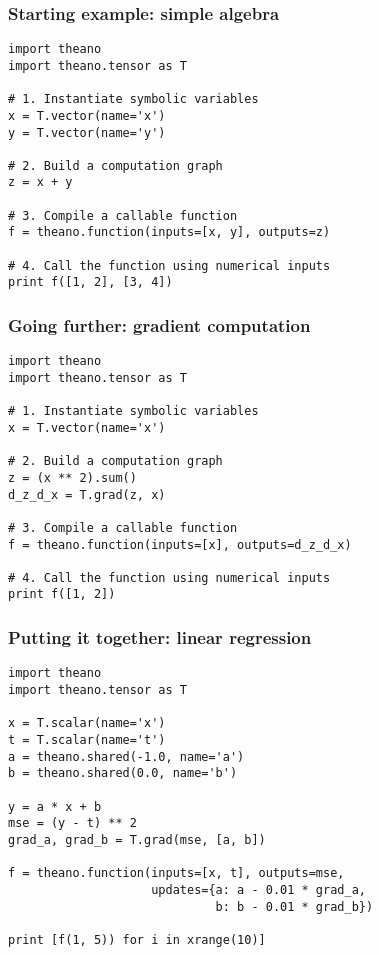 \documentclass[mathserif, xcolor=dvipsnames]{beamer}
\begin{document}
\begin{frame}[fragile]
    \frametitle{Starting example: simple algebra}
\begin{lstlisting}
import theano
import theano.tensor as T

# 1. Instantiate symbolic variables
x = T.vector(name='x')
y = T.vector(name='y')

# 2. Build a computation graph
z = x + y

# 3. Compile a callable function
f = theano.function(inputs=[x, y], outputs=z)

# 4. Call the function using numerical inputs
print f([1, 2], [3, 4])
\end{lstlisting}
\end{frame}

\begin{frame}[fragile]
    \frametitle{Going further: gradient computation}
\begin{lstlisting}
import theano
import theano.tensor as T

# 1. Instantiate symbolic variables
x = T.vector(name='x')

# 2. Build a computation graph
z = (x ** 2).sum()
d_z_d_x = T.grad(z, x)

# 3. Compile a callable function
f = theano.function(inputs=[x], outputs=d_z_d_x)

# 4. Call the function using numerical inputs
print f([1, 2])
\end{lstlisting}
\end{frame}

\begin{frame}[fragile]
    \frametitle{Putting it together: linear regression}
\begin{lstlisting}
import theano
import theano.tensor as T

x = T.scalar(name='x')
t = T.scalar(name='t')
a = theano.shared(-1.0, name='a')
b = theano.shared(0.0, name='b')

y = a * x + b
mse = (y - t) ** 2
grad_a, grad_b = T.grad(mse, [a, b])

f = theano.function(inputs=[x, t], outputs=mse,
                    updates={a: a - 0.01 * grad_a,
                             b: b - 0.01 * grad_b})

print [f(1, 5)) for i in xrange(10)]
\end{lstlisting}
\end{frame}
\end{document}
